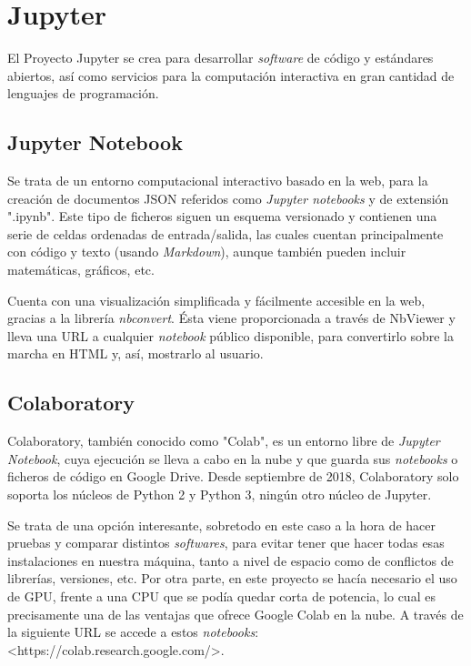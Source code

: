 \section{Jupyter}

El Proyecto Jupyter se crea para desarrollar \textit{software} de código y estándares abiertos, así como servicios para la computación interactiva en gran cantidad de lenguajes de programación. \cite{wiki:jupyter}


\subsection{Jupyter Notebook}

Se trata de un entorno computacional interactivo basado en la web, para la creación de documentos JSON referidos como \textit{Jupyter notebooks} y de extensión ".ipynb". Este tipo de ficheros siguen un esquema versionado y contienen una serie de celdas ordenadas de entrada/salida, las cuales cuentan principalmente con código y texto (usando \textit{Markdown}), aunque también pueden incluir matemáticas, gráficos, etc. \cite{wiki:jupyter}

Cuenta con una visualización simplificada y fácilmente accesible en la web, gracias a la librería \textit{nbconvert}. Ésta viene proporcionada a través de NbViewer y lleva una URL a cualquier \textit{notebook} público disponible, para convertirlo sobre la marcha en HTML y, así, mostrarlo al usuario.


\subsection{Colaboratory}

Colaboratory, también conocido como "Colab", es un entorno libre de \textit{Jupyter Notebook}, cuya ejecución se lleva a cabo en la nube y que guarda sus \textit{notebooks}
o ficheros de código en Google Drive. Desde septiembre de 2018, Colaboratory solo soporta los núcleos de Python 2 y Python 3, ningún otro núcleo de Jupyter. \cite{wiki:jupyter}

 Se trata de una opción interesante, sobretodo en este caso a la hora de hacer pruebas y comparar distintos \textit{softwares}, para evitar tener que hacer todas esas instalaciones en nuestra máquina, tanto a nivel de espacio como de conflictos de librerías, versiones, etc. Por otra parte, en este proyecto se hacía necesario el uso de GPU, frente a una CPU que se podía quedar corta de potencia, lo cual es precisamente una de las ventajas que ofrece Google Colab en la nube. A través de la siguiente URL se accede a estos \textit{notebooks}: <https://colab.research.google.com/>.


